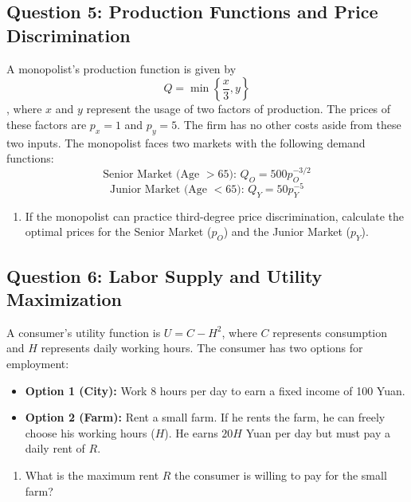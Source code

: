 \documentclass[12pt, a4paper]{article}
\begin{document}
\subsection*{Question 5: Production Functions and Price Discrimination}
A monopolist's production function is given by 
\[Q = \min\left\{\frac{x}{3}, y\right\}\], where $x$ and $y$ represent the usage of two factors of production. The prices of these factors are $p_x = 1$ and $p_y = 5$. The firm has no other costs aside from these two inputs. The monopolist faces two markets with the following demand functions:
\[ \text{Senior Market (Age }> 65\text{): } Q_O = 500 p_O^{-3/2} \]
\[ \text{Junior Market (Age }< 65\text{): } Q_Y = 50 p_Y^{-5} \]
\begin{enumerate}
    \item[(a)] If the monopolist can practice third-degree price discrimination, calculate the optimal prices for the Senior Market ($p_O$) and the Junior Market ($p_Y$).
\end{enumerate}

\subsection*{Question 6: Labor Supply and Utility Maximization}
A consumer's utility function is $U = C - H^2$, where $C$ represents consumption and $H$ represents daily working hours. The consumer has two options for employment:
\begin{itemize}
    \item \textbf{Option 1 (City):} Work 8 hours per day to earn a fixed income of 100 Yuan.
    \item \textbf{Option 2 (Farm):} Rent a small farm. If he rents the farm, he can freely choose his working hours ($H$). He earns $20H$ Yuan per day but must pay a daily rent of $R$.
\end{itemize}
\begin{enumerate}
    \item[(a)] What is the maximum rent $R$ the consumer is willing to pay for the small farm?
\end{enumerate}
\end{document}

